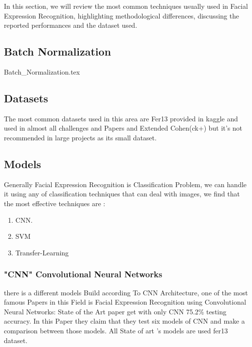 In this section, we will review the most common techniques usually used in Facial Expression Recognition, highlighting methodological differences, discussing the reported performances and the dataset used. \newline

\subsection{Batch Normalization}
{Batch_Normalization.tex}

\subsection{Datasets}
The most common datasets used in this area are Fer13 \label{fer_13} provided in kaggle and used in almost all challenges and Papers and Extended Cohen(ck+)\label{ck+} but it's not recommended in large projects as its small dataset.

\subsection{Models}
Generally Facial Expression Recognition is Classification Problem, we can handle it using any of classification techniques that can deal with images, we find that the most effective techniques are :
\begin{enumerate}
	\item CNN.
	\item SVM
	\item Transfer-Learning
\end{enumerate}
\subsubsection{"CNN" Convolutional Neural Networks}
there is a different models Build according To CNN Architecture, one of the most famous Papers in this Field is Facial Expression Recognition using Convolutional Neural Networks: State of the Art paper\cite{state_of_art} get with only CNN 75.2\% testing accuracy. In this Paper they claim that they test six models of CNN and make a comparison between those models. All State of art 's models are used fer13 dataset.

